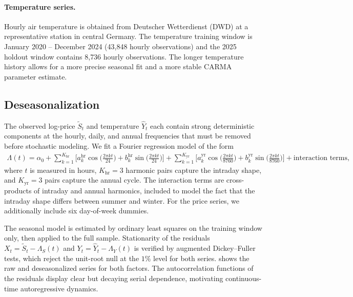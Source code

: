 \paragraph{Temperature series.}
Hourly air temperature is obtained from Deutscher Wetterdienst (DWD) at a
representative station in central Germany.
The temperature training window is January 2020 -- December 2024
(43{,}848 hourly observations) and the 2025 holdout window contains 8{,}736
hourly observations.
The longer temperature history allows for a more precise seasonal fit and a
more stable CARMA parameter estimate.

\subsection{Deseasonalization}\label{ssec:deseas}

The observed log-price $\widetilde{S}_t$ and temperature $\widehat{Y}_t$ each
contain strong deterministic components at the hourly, daily, and annual
frequencies that must be removed before stochastic modeling.
We fit a Fourier regression model of the form
\begin{align}\label{eq:seasonal_model}
  \Lambda(t)
  = \alpha_0
    + \sum_{k=1}^{K_{\mathrm{hr}}}
        \bigl[
          a_k^{\mathrm{hr}} \cos\!\bigl(\tfrac{2\pi k t}{24}\bigr)
          + b_k^{\mathrm{hr}} \sin\!\bigl(\tfrac{2\pi k t}{24}\bigr)
        \bigr]
    + \sum_{k=1}^{K_{\mathrm{yr}}}
        \bigl[
          a_k^{\mathrm{yr}} \cos\!\bigl(\tfrac{2\pi k t}{8760}\bigr)
          + b_k^{\mathrm{yr}} \sin\!\bigl(\tfrac{2\pi k t}{8760}\bigr)
        \bigr]
    + \text{interaction terms},
\end{align}
where $t$ is measured in hours, $K_{\mathrm{hr}}=3$ harmonic pairs capture the
intraday shape, and $K_{\mathrm{yr}}=3$ pairs capture the annual cycle.
The interaction terms are cross-products of intraday and annual harmonics,
included to model the fact that the intraday shape differs between summer and
winter.
For the price series, we additionally include six day-of-week dummies.

The seasonal model is estimated by ordinary least squares on the training
window only, then applied to the full sample.
Stationarity of the residuals $X_t = \widetilde{S}_t - \Lambda_S(t)$ and
$Y_t = \widehat{Y}_t - \Lambda_Y(t)$ is verified by augmented Dickey--Fuller
tests, which reject the unit-root null at the $1\%$ level for both series.
 shows the raw and deseasonalized series for both factors.
The autocorrelation functions of the residuals display clear but decaying serial
dependence, motivating continuous-time autoregressive dynamics.

